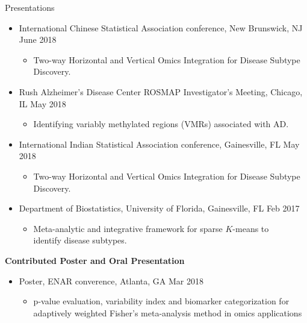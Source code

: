 \documentclass{resume} %
\begin{document}
\begin{rSection}{Presentations}
\begin{itemize}[noitemsep,topsep=0pt]
\item  International Chinese Statistical Association conference, New Brunswick, NJ  \hfill {June 2018}
\begin{itemize}[noitemsep,topsep=0pt]
\item{Two-way Horizontal and Vertical Omics Integration for Disease Subtype Discovery.}
\end{itemize}


\item  Rush Alzheimer's Disease Center ROSMAP Investigator's Meeting, Chicago, IL  \hfill {May 2018}
\begin{itemize}[noitemsep,topsep=0pt]
\item{Identifying variably methylated regions (VMRs) associated with AD.}
\end{itemize}

\item  International Indian Statistical Association conference, Gainesville, FL \hfill {May 2018}
\begin{itemize}[noitemsep,topsep=0pt]
\item{Two-way Horizontal and Vertical Omics Integration for Disease Subtype Discovery.}
\end{itemize}

\item  Department of Biostatistics, University of Florida, Gainesville, FL \hfill {Feb 2017}
\begin{itemize}[noitemsep,topsep=0pt]
\item{Meta-analytic and integrative framework for sparse $K$-means to\\ identify disease subtypes.}
\end{itemize}


\end{itemize}


\textbf{Contributed Poster and Oral Presentation}

\begin{itemize}[noitemsep,topsep=0pt]


\item  Poster, ENAR converence, Atlanta, GA \hfill {Mar 2018}
\begin{itemize}[noitemsep,topsep=0pt]
\item{p-value evaluation, variability index and biomarker categorization for \\adaptively
weighted Fisher's meta-analysis method in omics applications}
\end{itemize}



\end{itemize}
\end{rSection}
\end{document}
